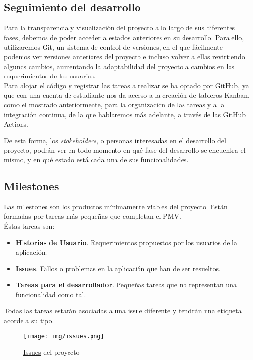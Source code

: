 \subsection{Seguimiento del desarrollo}
Para la transparencia y visualización del proyecto a lo largo de sus diferentes fases, debemos de poder acceder a
estados anteriores en su desarrollo. Para ello, utilizaremos Git, un sistema de control de versiones, en el que
fácilmente podemos ver versiones anteriores del proyecto e incluso volver a ellas revirtiendo algunos cambios,
aumentando la adaptabilidad del proyecto a cambios en los requerimientos de los usuarios.\\

Para alojar el código y registrar las tareas a realizar se ha optado por GitHub, ya que con una cuenta de estudiante
nos da acceso a la creación de tableros Kanban, como el mostrado anteriormente, para la organización de las tareas y a
la integración continua, de la que hablaremos más adelante, a través de las GitHub Actions.

De esta forma, los \textit{stakeholders}, o personas interesadas en el desarrollo del proyecto, podrán ver en todo
momento en qué fase del desarrollo se encuentra el mismo, y en qué estado está cada una de sus funcionalidades.\\

\subsection{Milestones}
Las milestones son los productos mínimamente viables del proyecto. Están formadas por tareas más pequeñas que completan
el PMV.\\

Éstas tareas son:
\begin{itemize}
    \item \href{https://github.com/Torchu/flixbuff/labels/user%20story}{\textbf{Historias de Usuario}}. Requerimientos
    propuestos por los usuarios de la aplicación.
    \item \href{https://github.com/Torchu/flixbuff/labels/issue}{\textbf{Issues}}. Fallos o problemas en la aplicación
    que han de ser resueltos.
    \item \href{https://github.com/Torchu/flixbuff/labels/dev%20task}{\textbf{Tareas para el desarrollador}}. Pequeñas
    tareas que no representan una funcionalidad como tal.
\end{itemize}

Todas las tareas estarán asociadas a una issue diferente y tendrán una etiqueta acorde a su tipo.
\begin{figure}[H]
	\centering	
	\texttt{[image: img/issues.png]}
	\caption{\href{https://github.com/Torchu/flixbuff/issues}{Issues} del proyecto}\label{fig:github_issues}
\end{figure}

